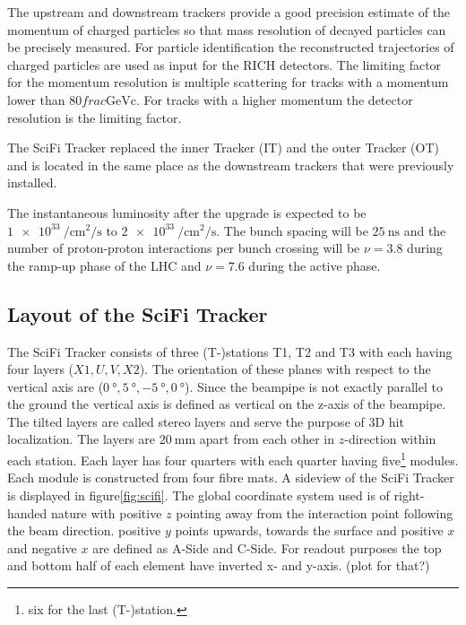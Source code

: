 The upstream and downstream trackers provide a good precision estimate of the momentum of charged particles so that mass resolution of decayed particles can be precisely measured. %
For particle identification the reconstructed trajectories of charged particles are used as input for the RICH detectors.
The limiting factor for the momentum resolution is multiple scattering for tracks with a momentum lower than $\num{80}frac{\text{GeV}}{\text{c}}$. For tracks with a higher momentum the detector resolution is the limiting factor.

The SciFi Tracker replaced the inner Tracker (IT) and the outer Tracker (OT)
and is located in the same place as the downstream trackers that were previously installed.

The instantaneous luminosity after the upgrade is expected to be $\SI{1e33}{\per\centi\metre\squared\per\second}$ to $\SI{2e33}{\per\centi\metre\squared\per\second}$. The bunch spacing will be $\SI{25}{\nano\second}$ and the number of proton-proton interactions per bunch crossing will be $\nu = 3.8$ during the ramp-up phase of the LHC and $\nu = 7.6$ during the active phase.

\subsection{Layout of the SciFi Tracker}


The SciFi Tracker consists of three (T-)stations T1, T2 and T3 with each having four layers ($X1, U, V, X2$). The orientation of these planes with respect to the vertical axis are ($\SI{0}{\degree}, \SI{+5}{\degree}, \SI{-5}{\degree}, \SI{0}{\degree}$).
Since the beampipe is not exactly parallel to the ground the vertical axis is
defined as vertical on the z-axis of the beampipe.
The tilted layers are called stereo layers and serve the purpose of 3D hit localization.
The layers are $\SI{20}{\milli\metre}$ apart from each other in $z$-direction within each station.
Each layer has four quarters with each quarter having five\footnote{six for the last (T-)station.} modules. Each module is constructed from four fibre mats.
A sideview of the SciFi Tracker is displayed in figure\ref{fig:scifi}.
The global coordinate system used is of right-handed nature with positive $z$ pointing away from the interaction point following the beam direction. positive $y$ points upwards, towards the surface and positive $x$ and negative $x$ are defined as A-Side and C-Side\cite{scifiInfo}.
For readout purposes the top and bottom half of each element have inverted x- and y-axis.
(plot for that?)

